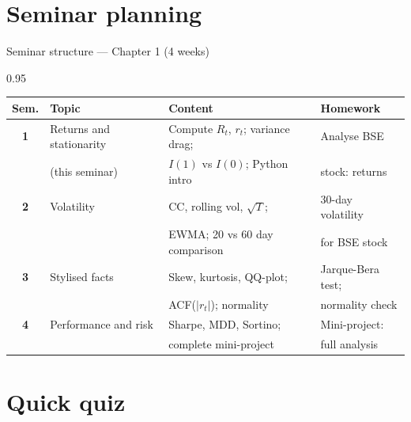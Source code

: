 \documentclass[9pt, aspectratio=169, t]{beamer}
\begin{document}
\section{Seminar planning}

\begin{frame}{Seminar structure --- Chapter 1 (4 weeks)}
    \begin{cminipage}{0.95\textwidth}
    \begin{center}
    {\small
    \renewcommand{\arraystretch}{1.4}
    \begin{tabular}{>{\bfseries}clll}
    \toprule
    \textbf{Sem.} & \textbf{Topic} & \textbf{Content} & \textbf{Homework} \\
    \midrule
    1 & Returns and stationarity & Compute $R_t$, $r_t$; variance drag; & Analyse BSE \\
      & (this seminar) & $I(1)$ vs $I(0)$; Python intro & stock: returns \\
    \midrule
    2 & Volatility & CC, rolling vol, $\sqrt{T}$; & 30-day volatility \\
      & & EWMA; 20 vs 60 day comparison & for BSE stock \\
    \midrule
    3 & Stylised facts & Skew, kurtosis, QQ-plot; & Jarque-Bera test; \\
      & & ACF($|r_t|$); normality & normality check \\
    \midrule
    4 & Performance and risk & Sharpe, MDD, Sortino; & Mini-project: \\
      & & complete mini-project & full analysis \\
    \bottomrule
    \end{tabular}
    }
    \end{center}
    \end{cminipage}
\end{frame}


\section{Quick quiz}
\end{document}
